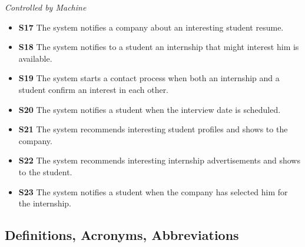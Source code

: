 \documentclass[a4paper,12pt]{article}
\begin{document}
    \textit{Controlled by Machine}
    \begin{itemize}
        \item \textbf{S17} The system notifies a company about an interesting student resume.
        \item \textbf{S18} The system notifies to a student an internship that might interest him is available.
        \item \textbf{S19} The system starts a contact process when both an internship and a student confirm an interest in each other.
        \item \textbf{S20} The system notifies a student when the interview date is scheduled.
        \item \textbf{S21} The system recommends interesting student profiles and shows to the company.
        \item \textbf{S22} The system recommends interesting internship advertisements and shows to the student.
        \item \textbf{S23} The system notifies a student when the company has selected him for the internship.
    \end{itemize}
\subsection{Definitions, Acronyms, Abbreviations}
\end{document}
